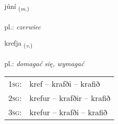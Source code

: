 \documentclass[frontgrid, backgrid]{flacards}\usepackage[]{graphicx}\usepackage[]{xcolor}
\begin{document}
\renewcommand{\flhead}{\vskip5pt \fboxsep=0pt {\small\bfseries\footnotesize Nafnorð | Noun}}
\renewcommand{\fcfoot}{\vskip5pt \fboxsep=0pt \hspace{2pt}{\small\bfseries\footnotesize 1K}}

\renewcommand{\blhead}{\vskip5pt {\small\bfseries\footnotesize Nafnorð | Noun }}
\renewcommand{\bcfoot}{\vskip5pt \hspace{2pt}{\small\bfseries\footnotesize 1K}}


{júní \small{\textsubscript{(\textit{m.})}} \\[1ex] %
\textphonetic{[juːni]} \\
pl.: \emph{czerwiec} \\  [2ex]
\renewcommand*{\arraystretch}{0.8}
}

\renewcommand{\flhead}{\vskip5pt \fboxsep=0pt {\small\bfseries\footnotesize Sagnorð | Verb}}
\renewcommand{\fcfoot}{\vskip5pt \fboxsep=0pt \hspace{2pt}{\small\bfseries\footnotesize 1K}}

\renewcommand{\blhead}{\vskip5pt {\small\bfseries\footnotesize Sagnorð | Verb }}
\renewcommand{\bcfoot}{\vskip5pt \hspace{2pt}{\small\bfseries\footnotesize 1K}}


{krefja \small{\textsubscript{(\textit{v.})}} \\[1ex] %
\textphonetic{[kʰrɛvja]} \\
pl.: \emph{domagać się, wymagać} \\  [2ex]
\renewcommand*{\arraystretch}{0.8}
\begin{tabular}{p{1cm}l}
\textsc{1sg}: & kref -- krafði -- krafið \\ 
\textsc{2sg}: & krefur -- krafðir -- krafið \\ 
\textsc{3sg}: & krefur -- krafði -- krafið \\ 
\end{tabular}
}
\end{document}
